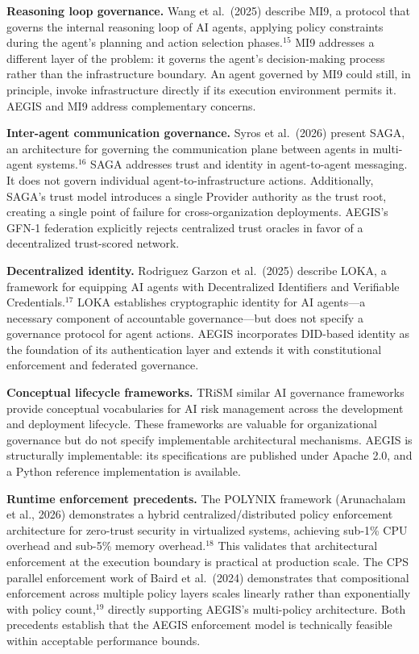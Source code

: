 \documentclass{IEEEcsmag}
\begin{document}
{\bf Reasoning loop governance.} Wang et al.\ (2025) describe MI9, a protocol that governs the internal reasoning loop of AI agents, applying policy constraints during the agent's planning and action selection phases.$^{15}$ MI9 addresses a different layer of the problem: it governs the agent's decision-making process rather than the infrastructure boundary. An agent governed by MI9 could still, in principle, invoke infrastructure directly if its execution environment permits it. AEGIS and MI9 address complementary concerns.

{\bf Inter-agent communication governance.} Syros et al.\ (2026) present SAGA, an architecture for governing the communication plane between agents in multi-agent systems.$^{16}$ SAGA addresses trust and identity in agent-to-agent messaging. It does not govern individual agent-to-infrastructure actions. Additionally, SAGA's trust model introduces a single Provider authority as the trust root, creating a single point of failure for cross-organization deployments. AEGIS's GFN-1 federation explicitly rejects centralized trust oracles in favor of a decentralized trust-scored network.

{\bf Decentralized identity.} Rodriguez Garzon et al.\ (2025) describe LOKA, a framework for equipping AI agents with Decentralized Identifiers and Verifiable Credentials.$^{17}$ LOKA establishes cryptographic identity for AI agents---a necessary component of accountable governance---but does not specify a governance protocol for agent actions. AEGIS incorporates DID-based identity as the foundation of its authentication layer and extends it with constitutional enforcement and federated governance.

{\bf Conceptual lifecycle frameworks.} TRiSM  similar AI governance frameworks provide conceptual vocabularies for AI risk management across the development and deployment lifecycle. These frameworks are valuable for organizational governance but do not specify implementable architectural mechanisms. AEGIS is structurally implementable: its specifications are published under Apache 2.0, and a Python reference implementation is available.

{\bf Runtime enforcement precedents.} The POLYNIX framework (Arunachalam et al., 2026) demonstrates a hybrid centralized/distributed policy enforcement architecture for zero-trust security in virtualized systems, achieving sub-1\% CPU overhead and sub-5\% memory overhead.$^{18}$ This validates that architectural enforcement at the execution boundary is practical at production scale. The CPS parallel enforcement work of Baird et al.\ (2024) demonstrates that compositional enforcement across multiple policy layers scales linearly rather than exponentially with policy count,$^{19}$ directly supporting AEGIS's multi-policy architecture. Both precedents establish that the AEGIS enforcement model is technically feasible within acceptable performance bounds.
\end{document}
